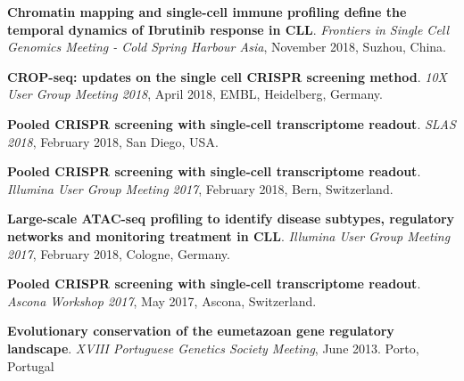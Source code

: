 \documentclass[11pt,a4paper,roman]{moderncv} %
\begin{document}
\begin{etaremune}[leftmargin=1.0cm,itemindent=0pt,topsep=10pt,itemsep=2pt,partopsep=0pt,parsep=0pt]
        \item
        \textbf{Chromatin mapping and single-cell immune profiling define the temporal dynamics of Ibrutinib response in CLL}. \textit{Frontiers in Single Cell Genomics Meeting - Cold Spring Harbour Asia}, November 2018, Suzhou, China.
        \item
        \textbf{CROP-seq: updates on the single cell CRISPR screening method}. \textit{10X User Group Meeting 2018}, April 2018, EMBL, Heidelberg, Germany.
        \item
        \textbf{Pooled CRISPR screening with single-cell transcriptome readout}. \textit{SLAS 2018}, February 2018, San Diego, USA.
        \item
        \textbf{Pooled CRISPR screening with single-cell transcriptome readout}. \textit{Illumina User Group Meeting 2017}, February 2018, Bern, Switzerland.
        \item
        \textbf{Large-scale ATAC-seq profiling to identify disease subtypes, regulatory networks and monitoring treatment in CLL}. \textit{Illumina User Group Meeting 2017}, February 2018, Cologne, Germany.
        \item
        \textbf{Pooled CRISPR screening with single-cell transcriptome readout}. \textit{Ascona Workshop 2017}, May 2017, Ascona, Switzerland.
        \item
        \textbf{Evolutionary conservation of the eumetazoan gene regulatory landscape}. \textit{XVIII Portuguese Genetics Society Meeting}, June 2013. Porto, Portugal
        \end{etaremune}
\end{document}
